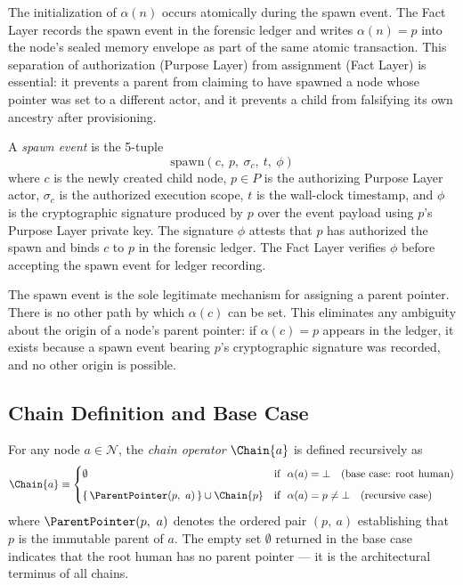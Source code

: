 The initialization of $\alpha(n)$ occurs atomically during the spawn event. The Fact Layer records the spawn event in the forensic ledger and writes $\alpha(n) = p$ into the node's sealed memory envelope as part of the same atomic transaction. This separation of authorization (Purpose Layer) from assignment (Fact Layer) is essential: it prevents a parent from claiming to have spawned a node whose pointer was set to a different actor, and it prevents a child from falsifying its own ancestry after provisioning.

\begin{dfn}\label{dfn:spawn-event}
A \emph{spawn event} is the 5-tuple
\begin{equation}
\mathrm{spawn}(c,\ p,\ \sigma_c,\ t,\ \phi)
\label{eq:spawn-event}
\end{equation}
where $c$ is the newly created child node, $p \in P$ is the authorizing Purpose Layer actor, $\sigma_c$ is the authorized execution scope, $t$ is the wall-clock timestamp, and $\phi$ is the cryptographic signature produced by $p$ over the event payload using $p$'s Purpose Layer private key. The signature $\phi$ attests that $p$ has authorized the spawn and binds $c$ to $p$ in the forensic ledger. The Fact Layer verifies $\phi$ before accepting the spawn event for ledger recording.
\end{dfn}

The spawn event is the sole legitimate mechanism for assigning a parent pointer. There is no other path by which $\alpha(c)$ can be set. This eliminates any ambiguity about the origin of a node's parent pointer: if $\alpha(c) = p$ appears in the ledger, it exists because a spawn event bearing $p$'s cryptographic signature was recorded, and no other origin is possible.

\subsection{Chain Definition and Base Case}
\label{sec:chain-definition}

\begin{dfn}\label{dfn:chain-operator}
For any node $a \in \mathcal{N}$, the \emph{chain operator} $\Chain{a}$ is defined recursively as
\begin{equation}
\Chain{a} \equiv
\begin{cases}
\emptyset & \text{if }\ \alpha(a) = \bot \quad \text{(base case: root human)} \\[6pt]
\{\, \ParentPointer(p,\ a) \, \} \cup \Chain{p} & \text{if }\ \alpha(a) = p \neq \bot \quad \text{(recursive case)}
\end{cases}
\label{eq:chain-operator}
\end{equation}
where $\ParentPointer(p,\ a)$ denotes the ordered pair $(p,\ a)$ establishing that $p$ is the immutable parent of $a$. The empty set $\emptyset$ returned in the base case indicates that the root human has no parent pointer --- it is the architectural terminus of all chains.
\end{dfn}

